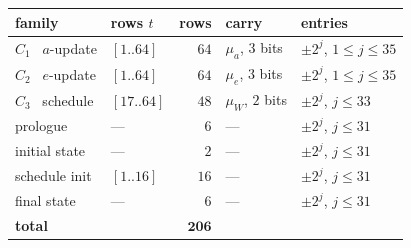 \begin{center}\small
\begin{tabular}{@{}llrll@{}}
\toprule
family & rows $t$ & rows & carry & entries\\
\midrule
$C_1$ \ $a$-update      & $[1..64]$  & $64$  & $\mu_a$, $3$ bits & $\pm2^j$, $1\leq j\leq35$\\
$C_2$ \ $e$-update      & $[1..64]$  & $64$  & $\mu_e$, $3$ bits & $\pm2^j$, $1\leq j\leq35$\\
$C_3$ \ schedule        & $[17..64]$ & $48$  & $\mu_W$, $2$ bits & $\pm2^j$, $j\leq33$\\
\midrule
prologue                & ---        & $6$   & --- & $\pm2^j$, $j\leq31$\\
initial state           & ---        & $2$   & --- & $\pm2^j$, $j\leq31$\\
schedule init           & $[1..16]$  & $16$  & --- & $\pm2^j$, $j\leq31$\\
final state             & ---        & $6$   & --- & $\pm2^j$, $j\leq31$\\
\midrule
\textbf{total}          &            & $\mathbf{206}$ & & \\
\bottomrule
\end{tabular}
\end{center}

